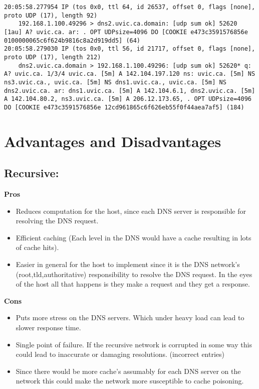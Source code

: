 \documentclass{article}
\begin{document}
{\begin{lstlisting}
20:05:58.277954 IP (tos 0x0, ttl 64, id 26537, offset 0, flags [none], proto UDP (17), length 92)
    192.168.1.100.49296 > dns2.uvic.ca.domain: [udp sum ok] 52620 [1au] A? uvic.ca. ar: . OPT UDPsize=4096 DO [COOKIE e473c3591576856e 0100000065c6f624b9816c8a2d919dd5] (64)
20:05:58.279030 IP (tos 0x0, ttl 56, id 21717, offset 0, flags [none], proto UDP (17), length 212)
    dns2.uvic.ca.domain > 192.168.1.100.49296: [udp sum ok] 52620* q: A? uvic.ca. 1/3/4 uvic.ca. [5m] A 142.104.197.120 ns: uvic.ca. [5m] NS ns3.uvic.ca., uvic.ca. [5m] NS dns1.uvic.ca., uvic.ca. [5m] NS dns2.uvic.ca. ar: dns1.uvic.ca. [5m] A 142.104.6.1, dns2.uvic.ca. [5m] A 142.104.80.2, ns3.uvic.ca. [5m] A 206.12.173.65, . OPT UDPsize=4096 DO [COOKIE e473c3591576856e 12cd961865c6f626eb55f0f44aea7af5] (184)

\end{lstlisting}
}



\section{Advantages and Disadvantages}
\subsection{Recursive: }
\textbf{Pros}
\begin{itemize}
    \item 
        Reduces computation for the host, since each DNS server is responsible for 
        resolving the DNS request.
    \item
        Efficient caching (Each level in the DNS would have a cache resulting in 
        lots of cache hits).
    \item
        Easier in general for the host to implement since it is the DNS network's (root,tld,authoritative)
        responsibility to resolve the DNS request. In the eyes of the host all that 
        happens is they make a request and they get a response.
\end{itemize}

\textbf{Cons}

\begin{itemize}
    \item
        Puts more stress on the DNS servers. Which under heavy load can lead to 
        slower response time.
    \item
        Single point of failure. If the recursive network is corrupted in some way
        this could lead to inaccurate or damaging resolutions. (incorrect entries)
    \item
        Since there would be more cache's assumably for each DNS server on the network
        this could make the network more susceptible to cache poisoning.
\end{itemize}
\end{document}
